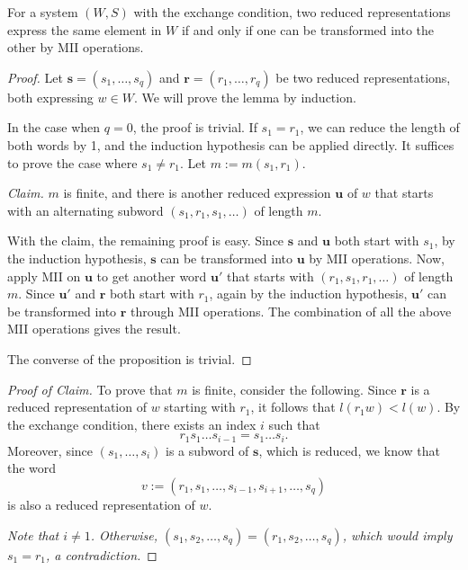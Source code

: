 \documentclass[../main.tex]{subfiles}
\begin{document}
\begin{lemma}
For a system $(W, S)$ with the exchange condition, two reduced representations express the same element in $W$ if and only if one can be transformed into the other by MII operations.

    \begin{proof}
        Let $\mathbf{s} = (s_1, \dots, s_q)$ and $\mathbf{r} = (r_1, \dots, r_q)$ be two reduced representations, both expressing $w \in W$. We will prove the lemma by induction.

        In the case when $q = 0$, the proof is trivial. If $s_1 = r_1$, we can reduce the length of both words by 1, and the induction hypothesis can be applied directly. It suffices to prove the case where $s_1 \neq r_1$. Let $m := m(s_1, r_1)$.

        \textit{Claim. }
            $m$ is finite, and there is another reduced expression $\mathbf{u}$ of $w$ that starts with an alternating subword $(s_1, r_1, s_1, \dots)$ of length $m$.

        With the claim, the remaining proof is easy. Since $\mathbf{s}$ and $\mathbf{u}$ both start with $s_1$, by the induction hypothesis, $\mathbf{s}$ can be transformed into $\mathbf{u}$ by MII operations. Now, apply MII on $\mathbf{u}$ to get another word $\mathbf{u'}$ that starts with $(r_1, s_1, r_1, \dots)$ of length $m$. Since $\mathbf{u'}$ and $\mathbf{r}$ both start with $r_1$, again by the induction hypothesis, $\mathbf{u'}$ can be transformed into $\mathbf{r}$ through MII operations. The combination of all the above MII operations gives the result.

        The converse of the proposition is trivial.
    \end{proof}

    \begin{proof}[Proof of Claim]
        To prove that \( m \) is finite, consider the following. Since \( \mathbf{r} \) is a reduced representation of \( w \) starting with \( r_1 \), it follows that \( l(r_1 w) < l(w) \). By the exchange condition, there exists an index \( i \) such that
        \[
        r_1 s_1 \dots s_{i-1} = s_1 \dots s_i.
        \]
        Moreover, since \( (s_1, \dots, s_i) \) is a subword of \( \mathbf{s} \), which is reduced, we know that the word 
        \[
        v := (r_1, s_1, \dots, s_{i-1}, s_{i+1}, \dots, s_q)
        \]
        is also a reduced representation of \( w \).
    
        \textit{Note that \( i \neq 1 \). Otherwise, \( (s_1, s_2, \dots, s_q) = (r_1, s_2, \dots, s_q) \), which would imply \( s_1 = r_1 \), a contradiction.}
    

\end{proof}
\end{lemma}
\end{document}
